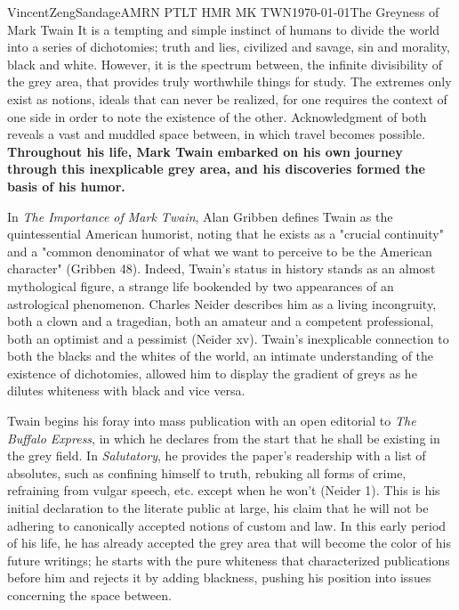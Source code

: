 \documentclass{article}[12pt]
\begin{document}
\begin{mla}{Vincent}{Zeng}{Sandage}{AMRN PTLT HMR MK TWN}{\today}{The Greyness of Mark Twain}
It is a tempting and simple instinct of humans to divide the world into a series of dichotomies; truth and lies, civilized and savage, sin and morality, black and white. However, it is the spectrum between, the infinite divisibility of the grey area, that provides truly worthwhile things for study. The extremes only exist as notions, ideals that can never be realized, for one requires the context of one side in order to note the existence of the other. Acknowledgment of both reveals a vast and muddled space between, in which travel becomes possible. \textbf{Throughout his life, Mark Twain embarked on his own journey through this inexplicable grey area, and his discoveries formed the basis of his humor.}

In \textit{The Importance of Mark Twain}, Alan Gribben defines Twain as the quintessential American humorist, noting that he exists as a "crucial continuity" and a "common denominator of what we want to perceive to be the American character" (Gribben 48). Indeed, Twain's status in history stands as an almost mythological figure, a strange life bookended by two appearances of an astrological phenomenon. Charles Neider describes him as a living incongruity, both a clown and a tragedian, both an amateur and a competent professional, both an optimist and a pessimist (Neider xv). Twain's inexplicable connection to both the blacks and the whites of the world, an intimate understanding of the existence of dichotomies, allowed him to display the gradient of greys as he dilutes whiteness with black and vice versa.

Twain begins his foray into mass publication with an open editorial to \textit{The Buffalo Express}, in which he declares from the start that he shall be existing in the grey field. In \textit{Salutatory}, he provides the paper's readership with a list of absolutes, such as confining himself to truth, rebuking all forms of crime, refraining from vulgar speech, etc. except when he won't (Neider 1). This is his initial declaration to the literate public at large, his claim that he will not be adhering to canonically accepted notions of custom and  law. In this early period of his life, he has already accepted the grey area that will become the color of his future writings; he starts with the pure whiteness that characterized publications before him and rejects it by adding blackness, pushing his position into issues concerning the space between.


\end{mla}
\end{document}
